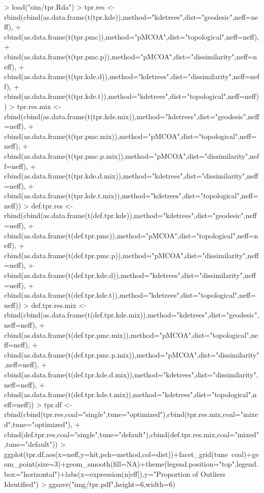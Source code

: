 \documentclass{article}
\begin{document}
\begin{Schunk}
\begin{Sinput}
> load("sim/tpr.Rda")
> tpr.res <- rbind(cbind(as.data.frame(t(tpr.kde)),method="kdetrees",dist="geodesic",neff=neff),
+                  cbind(as.data.frame(t(tpr.pmc)),method="pMCOA",dist="topological",neff=neff),
+                  cbind(as.data.frame(t(tpr.pmc.p)),method="pMCOA",dist="dissimilarity",neff=neff),
+                  cbind(as.data.frame(t(tpr.kde.d)),method="kdetrees",dist="dissimilarity",neff=neff),
+                  cbind(as.data.frame(t(tpr.kde.t)),method="kdetrees",dist="topological",neff=neff))
> tpr.res.mix <- rbind(cbind(as.data.frame(t(tpr.kde.mix)),method="kdetrees",dist="geodesic",neff=neff),
+                  cbind(as.data.frame(t(tpr.pmc.mix)),method="pMCOA",dist="topological",neff=neff),
+                  cbind(as.data.frame(t(tpr.pmc.p.mix)),method="pMCOA",dist="dissimilarity",neff=neff),
+                  cbind(as.data.frame(t(tpr.kde.d.mix)),method="kdetrees",dist="dissimilarity",neff=neff),
+                  cbind(as.data.frame(t(tpr.kde.t.mix)),method="kdetrees",dist="topological",neff=neff))
> def.tpr.res <- rbind(cbind(as.data.frame(t(def.tpr.kde)),method="kdetrees",dist="geodesic",neff=neff),
+                  cbind(as.data.frame(t(def.tpr.pmc)),method="pMCOA",dist="topological",neff=neff),
+                  cbind(as.data.frame(t(def.tpr.pmc.p)),method="pMCOA",dist="dissimilarity",neff=neff),
+                  cbind(as.data.frame(t(def.tpr.kde.d)),method="kdetrees",dist="dissimilarity",neff=neff),
+                  cbind(as.data.frame(t(def.tpr.kde.t)),method="kdetrees",dist="topological",neff=neff))
> def.tpr.res.mix <- rbind(cbind(as.data.frame(t(def.tpr.kde.mix)),method="kdetrees",dist="geodesic",neff=neff),
+                  cbind(as.data.frame(t(def.tpr.pmc.mix)),method="pMCOA",dist="topological",neff=neff),
+                  cbind(as.data.frame(t(def.tpr.pmc.p.mix)),method="pMCOA",dist="dissimilarity",neff=neff),
+                  cbind(as.data.frame(t(def.tpr.kde.d.mix)),method="kdetrees",dist="dissimilarity",neff=neff),
+                  cbind(as.data.frame(t(def.tpr.kde.t.mix)),method="kdetrees",dist="topological",neff=neff))
> tpr.df <- rbind(cbind(tpr.res,coal="single",tune="optimized"),cbind(tpr.res.mix,coal="mixed",tune="optimized"),
+                 cbind(def.tpr.res,coal="single",tune="default"),cbind(def.tpr.res.mix,coal="mixed",tune="default"))
> ggplot(tpr.df,aes(x=neff,y=hit,pch=method,col=dist))+facet_grid(tune~coal)+geom_point(size=3)+geom_smooth(fill=NA)+theme(legend.position="top",legend.box="horizontal")+labs(x=expression(n[eff]),y="Proportion of Outliers Identified")
> ggsave("img/tpr.pdf",height=6,width=6)
\end{Sinput}
\end{Schunk}
\end{document}
